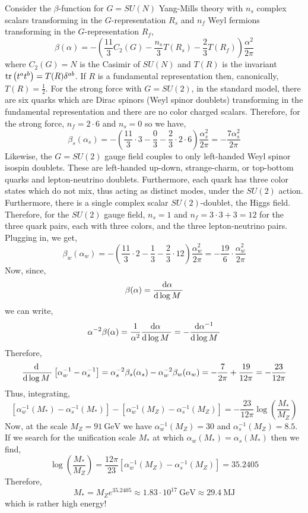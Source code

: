 \documentclass[12pt]{article}
\begin{document}
Consider the $\beta$-function for $G = SU(N)$ Yang-Mills theory with $n_s$ complex scalars transforming in the $G$-representation $R_s$ and $n_f$ Weyl fermions transforming in the $G$-representation $R_f$,
\[ \beta(\alpha) = - \left( \frac{11}{3} C_2(G) - \frac{n_s}{3} T(R_s) - \frac{2}{3} T(R_f) \right) \frac{\alpha^2}{2 \pi} \]
where $C_2(G) = N$ is the Casimir of $SU(N)$ and $T(R)$ is the invariant $\mathrm{tr} \left( t^a t^b \right) = T(R) \delta^{ab}$. If $R$ is a fundamental representation then, canonically, $T(R) = \frac{1}{2}$. For the strong force with $G = SU(2)$, in the standard model, there are six quarks which are Dirac spinors (Weyl spinor doublets) transforming in the fundamental representation and there are no color charged scalars. Therefore, for the strong force, $n_f = 2 \cdot 6$ and $n_s = 0$ so we have,
\[ \beta_s(\alpha_s) = - \left( \frac{11}{3} \cdot 3 - \frac{0}{3} - \frac{2}{3} \cdot 2 \cdot 6 \right) \frac{\alpha_s^2}{2 \pi} = - \frac{7 \alpha_s^2}{2 \pi} \]
Likewise, the $G = SU(2)$ gauge field couples to only left-handed Weyl spinor isospin doublets. These are left-handed up-down, strange-charm, or top-bottom quarks and lepton-neutrino doublets. Furthermore, each quark has three color states which do not mix, thus acting as distinct modes, under the $SU(2)$ action. Furthermore, there is a single complex scalar $SU(2)$-doublet, the Higgs field. Therefore, for the $SU(2)$ gauge field, $n_s = 1$ and $n_f = 3 \cdot 3 + 3 = 12$ for the three quark pairs, each with three colors, and the three lepton-neutrino pairs. Plugging in, we get,
\[ \beta_w(\alpha_w) = - \left( \frac{11}{3} \cdot 2 - \frac{1}{3} - \frac{2}{3} \cdot 12 \right) \frac{\alpha_w^2}{2 \pi} = - \frac{19}{6} \cdot \frac{\alpha_w^2}{2 \pi} \]   
Now, since,
\[ \beta(\alpha) = \frac{\mathrm{d}\alpha \:}{\mathrm{d}\log{M} \:} \]
we can write,
\[ \alpha^{-2} \beta(\alpha) = \frac{1}{\alpha^2} \frac{\mathrm{d}\alpha \:}{\mathrm{d}\log{M} \:} = - \frac{\mathrm{d}\alpha^{-1} \:}{\mathrm{d}\log{M} \:} \]
Therefore,
\[ \frac{\mathrm{d} \:}{\mathrm{d}\log{M} \:} \left[ \alpha_w^{-1} - \alpha_s^{-1} \right] = \alpha_s^{-2} \beta_s(\alpha_s) - \alpha_w^{-2} \beta_w(\alpha_w) = - \frac{7}{2 \pi} + \frac{19}{12 \pi} = - \frac{23}{12 \pi}  \] 
Thus, integrating,
\[ \left[ \alpha_w^{-1}(M_{*}) -  \alpha_s^{-1}(M_{*}) \right] - \left[ \alpha_w^{-1}(M_Z) -  \alpha_s^{-1}(M_Z) \right] = - \frac{23}{12 \pi} \log{\left( \frac{M_*}{M_Z} \right)} \] 
Now, at the scale $M_Z = 91 \: \mathrm{GeV}$ we have $\alpha_w^{-1}(M_Z) = 30$ and $\alpha_s^{-1}(M_Z) = 8.5$. If we search for the unification scale $M_*$ at which $\alpha_w(M_*) = \alpha_s(M_*)$ then we find,
\[ \log{\left( \frac{M_*}{M_Z} \right)} = \frac{12 \pi}{23} \left[ \alpha_w^{-1}(M_Z) -  \alpha_s^{-1}(M_Z) \right] = 35.2405 \]
Therefore,
\[ M_* = M_Z e^{35.2405} \approx 1.83 \cdot 10^{17} \: \mathrm{GeV} \approx 29.4 \: \mathrm{MJ}  \]
which is rather high energy!
\end{document}
